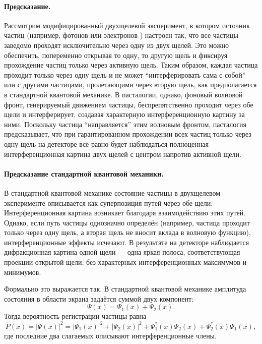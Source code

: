 \documentclass[pdflatex,sn-mathphys-num]{sn-jnl}
\begin{document}
\paragraph{Предсказание.} Рассмотрим модифицированный двухщелевой эксперимент, в котором источник частиц (например, фотонов или электронов \cite{tonomura1989-electron}) настроен так, что все частицы заведомо проходят исключительно через одну из двух щелей. Это можно обеспечить, попеременно открывая то одну, то другую щель и фиксируя прохождение частиц только через активную щель. Таким образом, каждая частица проходит только через одну щель и не может ``интерферировать сама с собой'' или с другими частицами, пролетающими через вторую щель, как предполагается в стандартной квантовой механике. В пасталогии, однако, фоновый волновой фронт, генерируемый движением частицы, беспрепятственно проходит через обе щели и интерферирует, создавая характерную интерференционную картину за ними. Поскольку частица ``направляется'' этим волновым фронтом, пасталогия предсказывает, что при гарантированном прохождении всех частиц только через одну щель на детекторе всё равно будет наблюдаться полноценная интерференционная картина двух щелей с центром напротив активной щели.

\paragraph{Предсказание стандартной квантовой механики.} В стандартной квантовой механике состояние частицы в двухщелевом эксперименте описывается как суперпозиция путей через обе щели. Интерференционная картина возникает благодаря взаимодействию этих путей. Однако, если путь частицы однозначно определён (например, частица проходит только через одну щель, а вторая щель не вносит вклада в волновую функцию), интерференционные эффекты исчезают. В результате на детекторе наблюдается дифракционная картина одной щели --- одна яркая полоса, соответствующая проекции открытой щели, без характерных интерференционных максимумов и минимумов.

Формально это выражается так. В стандартной квантовой механике амплитуда состояния в области экрана задаётся суммой двух компонент:
\begin{equation}
    \Psi(x) = \Psi_1(x) + \Psi_2(x).
\end{equation}
Тогда вероятность регистрации частицы равна
\begin{equation}
    P(x) = |\Psi(x)|^2 = |\Psi_1(x)|^2 + |\Psi_2(x)|^2 + \Psi_1^*(x)\Psi_2(x) + \Psi_2^*(x)\Psi_1(x),
\end{equation}
где последние два слагаемых описывают интерференционные члены.
\end{document}
